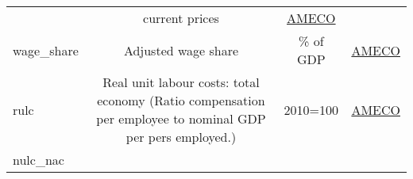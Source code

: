 \documentclass[]{article}
\begin{document}
\begin{longtable}[]{@{}lccc@{}}
\begin{minipage}[t]{0.36\columnwidth}
\end{minipage} & \begin{minipage}[t]{0.24\columnwidth}\centering\strut
current prices\strut
\end{minipage} & \begin{minipage}[t]{0.15\columnwidth}\centering\strut
\href{https://ec.europa.eu/info/business-economy-euro/indicators-statistics/economic-databases/macro-economic-database-ameco/download-annual-data-set-macro-economic-database-ameco_en}{AMECO}\strut
\end{minipage}\tabularnewline
\begin{minipage}[t]{0.14\columnwidth}\raggedright\strut
wage\_share\strut
\end{minipage} & \begin{minipage}[t]{0.36\columnwidth}\centering\strut
Adjusted wage share\strut
\end{minipage} & \begin{minipage}[t]{0.24\columnwidth}\centering\strut
\% of GDP\strut
\end{minipage} & \begin{minipage}[t]{0.15\columnwidth}\centering\strut
\href{https://ec.europa.eu/info/business-economy-euro/indicators-statistics/economic-databases/macro-economic-database-ameco/download-annual-data-set-macro-economic-database-ameco_en}{AMECO}\strut
\end{minipage}\tabularnewline
\begin{minipage}[t]{0.14\columnwidth}\raggedright\strut
rulc\strut
\end{minipage} & \begin{minipage}[t]{0.36\columnwidth}\centering\strut
Real unit labour costs: total economy (Ratio compensation per employee
to nominal GDP per pers employed.)\strut
\end{minipage} & \begin{minipage}[t]{0.24\columnwidth}\centering\strut
2010=100\strut
\end{minipage} & \begin{minipage}[t]{0.15\columnwidth}\centering\strut
\href{https://ec.europa.eu/info/business-economy-euro/indicators-statistics/economic-databases/macro-economic-database-ameco/download-annual-data-set-macro-economic-database-ameco_en}{AMECO}\strut
\end{minipage}\tabularnewline
\begin{minipage}[t]{0.14\columnwidth}\raggedright\strut
nulc\_nac\strut
\end{minipage} & \begin{minipage}[t]{0.36\columnwidth}\centering\strut

\end{minipage}
\end{longtable}
\end{document}
